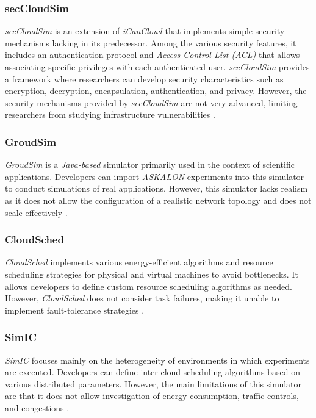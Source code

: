 {\subsubsection*{secCloudSim}
\emph{secCloudSim} \cite{rehman2014seccloudsim} is an extension of \emph{iCanCloud} that implements simple security mechanisms lacking in its predecessor. Among the various security features, it includes an authentication protocol and \emph{Access Control List (ACL)} that allows associating specific privileges with each authenticated user. \emph{secCloudSim} provides a framework where researchers can develop security characteristics such as encryption, decryption, encapsulation, authentication, and privacy. However, the security mechanisms provided by \emph{secCloudSim} are not very advanced, limiting researchers from studying infrastructure vulnerabilities \cite{mansouri2020cloud}.
\subsubsection*{GroudSim}
\emph{GroudSim} \cite{ostermann2011groudsim} is a \emph{Java-based} simulator primarily used in the context of scientific applications. Developers can import \emph{ASKALON} experiments \cite{fahringer2005askalon} into this simulator to conduct simulations of real applications. However, this simulator lacks realism as it does not allow the configuration of a realistic network topology and does not scale effectively \cite{mansouri2020cloud}.

\subsubsection*{CloudSched}
\emph{CloudSched} \cite{tian2013toolkit} implements various energy-efficient algorithms and resource scheduling strategies for physical and virtual machines to avoid bottlenecks. It allows developers to define custom resource scheduling algorithms as needed. However, \emph{CloudSched} does not consider task failures, making it unable to implement fault-tolerance strategies \cite{mansouri2020cloud}.

\subsubsection*{SimIC}
\emph{SimIC} \cite{sotiriadis2013simic} focuses mainly on the heterogeneity of environments in which experiments are executed. Developers can define inter-cloud scheduling algorithms based on various distributed parameters. However, the main limitations of this simulator are that it does not allow investigation of energy consumption, traffic controls, and congestions \cite{mansouri2020cloud}.
}
